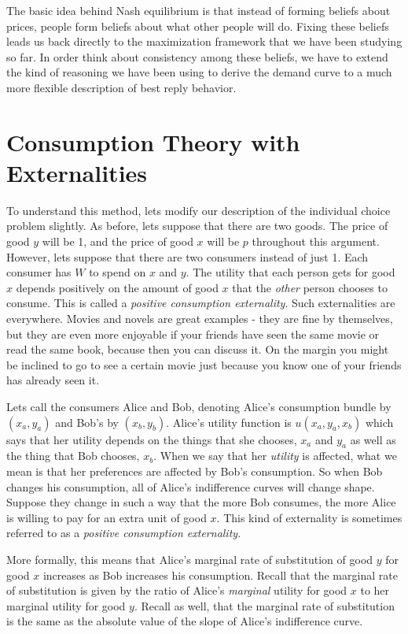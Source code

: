 \documentclass[12pt]{article}
\newcommand{\tmem}[1]{{\em #1\/}}
\begin{document}
The basic idea behind Nash equilibrium is that instead of forming beliefs
about prices, people form beliefs about what other people will do. Fixing
these beliefs leads us back directly to the maximization framework that we
have been studying so far. In order think about consistency among these
beliefs, we have to extend the kind of reasoning we have been using to derive
the demand curve to a much more flexible description of best reply behavior.

\section{Consumption Theory with Externalities}

To understand this method, lets modify our description of the individual
choice problem slightly. As before, lets suppose that there are two goods. The
price of good $y$ will be 1, and the price of good $x$ will be $p$ throughout
this argument. However, lets suppose that there are two consumers instead of
just 1. Each consumer has $W$ to spend on $x$ and $y$. The utility that each
person gets for good $x$ depends positively on the amount of good $x$ that the
{\tmem{other}} person chooses to consume. This is called a {\tmem{positive
consumption externality}}. Such externalities are everywhere. Movies and
novels are great examples - they are fine by themselves, but they are even
more enjoyable if your friends have seen the same movie or read the same book,
because then you can discuss it. On the margin you might be inclined to go to
see a certain movie just because you know one of your friends has already seen
it.

Lets call the consumers Alice and Bob, denoting Alice's consumption bundle by
$( x_a, y_a )$ and Bob's by $( x_b, y_b ) .$ Alice's utility function is $u (
x_a, y_a, x_b )$ which says that her utility depends on the things that she
chooses, $x_a$ and $y_a$ as well as the thing that Bob chooses, $x_b$. When we
say that her {\tmem{utility}} is affected, what we mean is that her
preferences are affected by Bob's consumption. So when Bob changes his
consumption, all of Alice's indifference curves will change shape. Suppose
they change in such a way that the more Bob consumes, the more Alice is
willing to pay for an extra unit of good $x$. This kind of externality is
sometimes referred to as a {\tmem{positive consumption externality}}.

More formally, this means that Alice's marginal rate of substitution of good
$y$ for good $x$ increases as Bob increases his consumption. Recall that the
marginal rate of substitution is given by the ratio of Alice's
{\tmem{marginal}} utility for good $x$ to her marginal utility for good $y$.
Recall as well, that the marginal rate of substitution is the same as the
absolute value of the slope of Alice's indifference curve.
\end{document}
